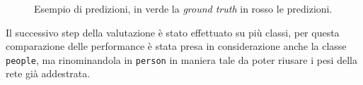 \begin{figure}[]
{{\begin{minipage}[b][][t]{.3\textwidth}
        \end{minipage}
    }
    }
    \caption{Esempio di predizioni, in verde la \textit{ground truth} in rosso le predizioni.} 
    \label{fig:prediction_test_first} 
\end{figure}


Il successivo step della valutazione è stato effettuato su più classi, per questa comparazione delle performance è stata presa in considerazione anche la classe \texttt{people}, ma rinominandola in \texttt{person} in maniera tale da poter riusare i pesi della rete già addestrata. 
